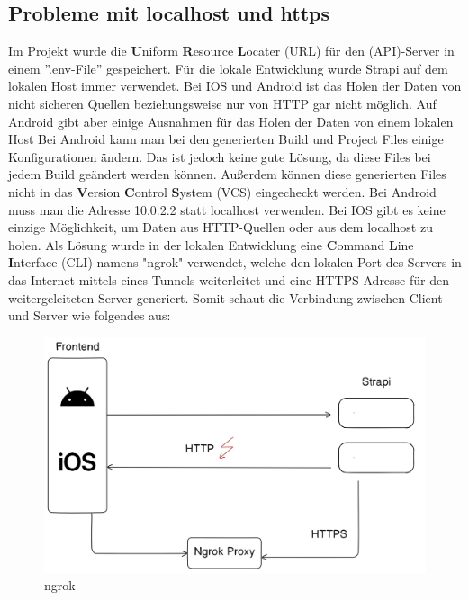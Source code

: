 \begin{spacing}{1}


    \section{Probleme mit localhost und https}\label{sec:probleme-mit-localhost-und-https}

    Im Projekt wurde  die \textbf{U}niform \textbf{R}esource
    \textbf{L}ocater (URL) für den (API)-Server in einem ''.env-File'' gespeichert.
    Für die lokale Entwicklung wurde Strapi auf dem lokalen Host immer verwendet.
    Bei IOS und Android ist das Holen der Daten von nicht sicheren Quellen
    beziehungsweise nur von HTTP gar nicht möglich. Auf Android gibt aber einige
    Ausnahmen für das Holen der Daten von einem lokalen Host
    Bei Android kann man bei den generierten Build und Project Files einige Konfigurationen ändern.
    Das ist jedoch keine gute Lösung, da diese Files bei jedem Build geändert werden können.
    Außerdem können diese generierten Files nicht in das \textbf{V}ersion \textbf{C}ontrol \textbf{S}ystem (VCS)
    eingecheckt werden.
    Bei Android muss man die Adresse 10.0.2.2 statt localhost verwenden.\cite{androidFetch}
    Bei IOS gibt es keine einzige Möglichkeit,
    um Daten aus HTTP-Quellen oder aus dem localhost zu holen.
    Als Lösung wurde in der lokalen Entwicklung eine \textbf{C}ommand \textbf{L}ine \textbf{I}nterface (CLI) namens "ngrok" verwendet,
    welche den lokalen Port des Servers in das Internet mittels eines Tunnels weiterleitet
    und eine HTTPS-Adresse für den weitergeleiteten Server generiert. Somit schaut die Verbindung zwischen Client und Server wie folgendes aus:
    \begin{figure}[H]
        \centering
        \includegraphics[width=\textwidth]{./pics/https-dev}
        \caption{ngrok}
    \end{figure}


\end{spacing}
